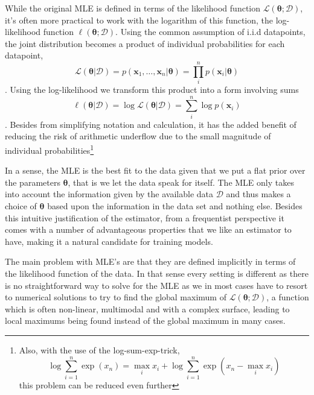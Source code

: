 While the original MLE is defined in terms of the likelihood function
$\mathcal{L}(\bm{\theta}; \mathcal{D})$, it's often more practical to work with
the logarithm of this function, the log-likelihood function $\ell(\bm{\theta} ;
\mathcal{D})$. Using the common assumption of i.i.d datapoints, the joint
distribution becomes a product of individual probabilities for each datapoint,
\begin{equation}
  \label{eq:likelihood}
  \mathcal{L}(\bm{\theta} | \mathcal{D}) = p(\bm{x}_1, \dots, \bm{x}_n | \bm{\theta}) = \prod_i^n p(\bm{x}_i | \bm{\theta})
\end{equation}.
Using the log-likelihood we transform this product into a form involving sums
\begin{equation}
  \label{eq:log-likelihood}
  \ell(\bm{\theta} | \mathcal{D}) = \log \mathcal{L}(\bm{\theta} | \mathcal{D}) = \sum_i^n \log p(\bm{x}_i)
\end{equation}.
Besides from simplifying notation and calculation, it has the added benefit of
reducing the risk of arithmetic underflow due to the small magnitude of
individual probabilities\footnote{Also, with the use of the log-sum-exp-trick,
  \begin{equation*}
    \log \sum_{i=1}^n \exp(x_n) = \max_i x_i + \log \sum_{i=1}^n \exp(x_n - \max_i x_i)
  \end{equation*}
  this problem can be reduced even further}

In a sense, the MLE is the best fit to the data given that we put a flat prior
over the parameters $\bm{\theta}$, that is we let the data speak for itself. The
MLE only takes into account the information given by the available data
$\mathcal{D}$ and thus makes a choice of $\bm{\theta}$ based upon the
information in the data set and nothing else. Besides this intuitive
justification of the estimator, from a frequentist perspective it comes with a
number of advantageous properties that we like an estimator to have, making it a
natural candidate for training models.

The main problem with MLE's are that they are defined implicitly in terms of the
likelihood function of the data. In that sense every setting is different as
there is no straightforward way to solve for the MLE as we in most cases have to
resort to numerical solutions to try to find the global maximum of
$\mathcal{L}(\bm{\theta}; \mathcal{D})$, a function which is often non-linear,
multimodal and with a complex surface, leading to local maximums being found
instead of the global maximum in many cases.\cite{CaseBerg:01}

